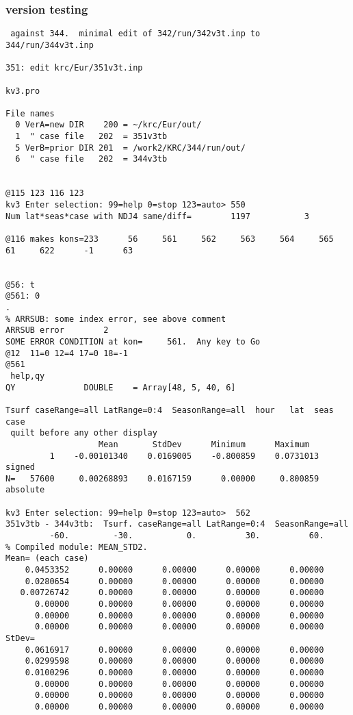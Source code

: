 \documentclass{article}
\begin{document}
\subsubsection {version testing}
 
\begin{verbatim}
 against 344.  minimal edit of 342/run/342v3t.inp to 344/run/344v3t.inp
 
351: edit krc/Eur/351v3t.inp

kv3.pro 

File names
  0 VerA=new DIR    200 = ~/krc/Eur/out/
  1  " case file   202  = 351v3tb
  5 VerB=prior DIR 201  = /work2/KRC/344/run/out/
  6  " case file   202  = 344v3tb


@115 123 116 123
kv3 Enter selection: 99=help 0=stop 123=auto> 550
Num lat*seas*case with NDJ4 same/diff=        1197           3

@116 makes kons=233      56     561     562     563     564     565      61     622      -1      63


@56: t
@561: 0
.
% ARRSUB: some index error, see above comment
ARRSUB error        2
SOME ERROR CONDITION at kon=     561.  Any key to Go
@12  11=0 12=4 17=0 18=-1
@561
 help,qy
QY              DOUBLE    = Array[48, 5, 40, 6]

Tsurf caseRange=all LatRange=0:4  SeasonRange=all  hour   lat  seas  case
 quilt before any other display
                   Mean       StdDev      Minimum      Maximum
         1    -0.00101340    0.0169005    -0.800859    0.0731013  signed
N=   57600     0.00268893    0.0167159      0.00000     0.800859  absolute

kv3 Enter selection: 99=help 0=stop 123=auto>  562
351v3tb - 344v3tb:  Tsurf. caseRange=all LatRange=0:4  SeasonRange=all
         -60.         -30.           0.          30.          60.
% Compiled module: MEAN_STD2.
Mean= (each case)
    0.0453352      0.00000      0.00000      0.00000      0.00000
    0.0280654      0.00000      0.00000      0.00000      0.00000
   0.00726742      0.00000      0.00000      0.00000      0.00000
      0.00000      0.00000      0.00000      0.00000      0.00000
      0.00000      0.00000      0.00000      0.00000      0.00000
      0.00000      0.00000      0.00000      0.00000      0.00000
StDev=
    0.0616917      0.00000      0.00000      0.00000      0.00000
    0.0299598      0.00000      0.00000      0.00000      0.00000
    0.0100296      0.00000      0.00000      0.00000      0.00000
      0.00000      0.00000      0.00000      0.00000      0.00000
      0.00000      0.00000      0.00000      0.00000      0.00000
      0.00000      0.00000      0.00000      0.00000      0.00000


\end{verbatim}
\end{document}
